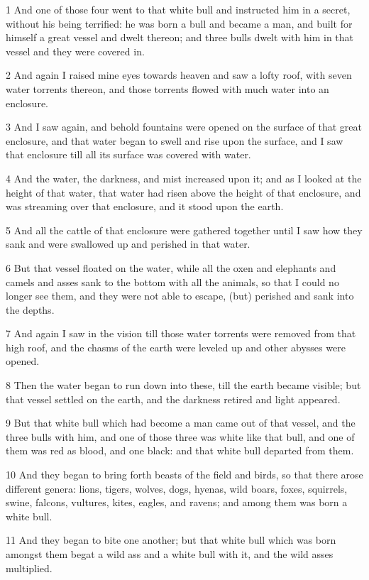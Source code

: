 \par 1 And one of those four went to that white bull and instructed him in a secret, without his being terrified: he was born a bull and became a man, and built for himself a great vessel and dwelt thereon; and three bulls dwelt with him in that vessel and they were covered in.
\par 2 And again I raised mine eyes towards heaven and saw a lofty roof, with seven water torrents thereon, and those torrents flowed with much water into an enclosure.
\par 3 And I saw again, and behold fountains were opened on the surface of that great enclosure, and that water began to swell and rise upon the surface, and I saw that enclosure till all its surface was covered with water.
\par 4 And the water, the darkness, and mist increased upon it; and as I looked at the height of that water, that water had risen above the height of that enclosure, and was streaming over that enclosure, and it stood upon the earth.
\par 5 And all the cattle of that enclosure were gathered together until I saw how they sank and were swallowed up and perished in that water.
\par 6 But that vessel floated on the water, while all the oxen and elephants and camels and asses sank to the bottom with all the animals, so that I could no longer see them, and they were not able to escape, (but) perished and sank into the depths.
\par 7 And again I saw in the vision till those water torrents were removed from that high roof, and the chasms of the earth were leveled up and other abysses were opened.
\par 8 Then the water began to run down into these, till the earth became visible; but that vessel settled on the earth, and the darkness retired and light appeared.
\par 9 But that white bull which had become a man came out of that vessel, and the three bulls with him, and one of those three was white like that bull, and one of them was red as blood, and one black: and that white bull departed from them.
\par 10 And they began to bring forth beasts of the field and birds, so that there arose different genera: lions, tigers, wolves, dogs, hyenas, wild boars, foxes, squirrels, swine, falcons, vultures, kites, eagles, and ravens; and among them was born a white bull.
\par 11 And they began to bite one another; but that white bull which was born amongst them begat a wild ass and a white bull with it, and the wild asses multiplied.
